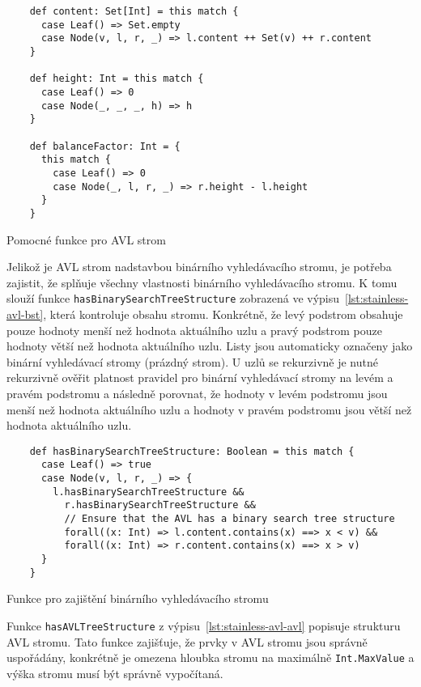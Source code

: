 \begin{listing}[H]
  \begin{verbatim}
    def content: Set[Int] = this match {
      case Leaf() => Set.empty
      case Node(v, l, r, _) => l.content ++ Set(v) ++ r.content
    }

    def height: Int = this match {
      case Leaf() => 0
      case Node(_, _, _, h) => h
    }

    def balanceFactor: Int = {
      this match {
        case Leaf() => 0
        case Node(_, l, r, _) => r.height - l.height
      }
    }
  \end{verbatim}
  \caption{Pomocné funkce pro AVL strom}
  \label{lst:stainless-avl-helper}
\end{listing}

Jelikož je AVL strom nadstavbou binárního vyhledávacího stromu,
je potřeba zajistit, že splňuje všechny vlastnosti binárního vyhledávacího stromu.
K tomu slouží funkce \texttt{hasBinarySearchTreeStructure} zobrazená ve výpisu~\ref{lst:stainless-avl-bst},
která kontroluje obsahu stromu.
Konkrétně, že levý podstrom obsahuje pouze hodnoty menší než hodnota aktuálního uzlu
a pravý podstrom pouze hodnoty větší než hodnota aktuálního uzlu.
Listy jsou automaticky označeny jako binární vyhledávací stromy (prázdný strom).
U uzlů se rekurzivně je nutné rekurzivně ověřit platnost pravidel pro
binární vyhledávací stromy na levém a pravém podstromu
a následně porovnat, že hodnoty v levém podstromu jsou menší než hodnota aktuálního uzlu
a hodnoty v pravém podstromu jsou větší než hodnota aktuálního uzlu.

\begin{listing}[H]
  \begin{verbatim}
    def hasBinarySearchTreeStructure: Boolean = this match {
      case Leaf() => true
      case Node(v, l, r, _) => {
        l.hasBinarySearchTreeStructure &&
          r.hasBinarySearchTreeStructure &&
          // Ensure that the AVL has a binary search tree structure
          forall((x: Int) => l.content.contains(x) ==> x < v) &&
          forall((x: Int) => r.content.contains(x) ==> x > v)
      }
    }
  \end{verbatim}
  \caption{Funkce pro zajištění binárního vyhledávacího stromu}
  \label{lst:stainless-avl-bst}
\end{listing}

Funkce \texttt{hasAVLTreeStructure} z výpisu~\ref{lst:stainless-avl-avl}
popisuje strukturu AVL stromu.
Tato funkce zajišťuje, že prvky v AVL stromu jsou správně uspořádány,
konkrétně je omezena hloubka stromu na maximálně \texttt{Int.MaxValue}
a výška stromu musí být správně vypočítaná.


